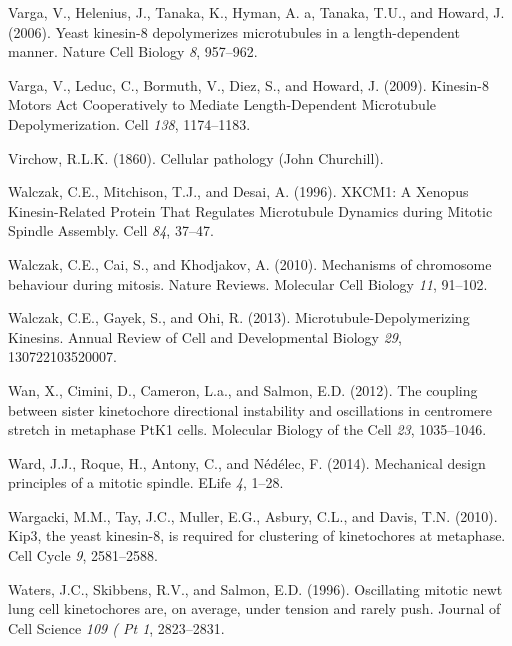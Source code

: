 \documentclass[12pt,a4paper,twoside,openright]{book}
\begin{document}
Varga, V., Helenius, J., Tanaka, K., Hyman, A. a, Tanaka, T.U., and
Howard, J. (2006). Yeast kinesin-8 depolymerizes microtubules in a
length-dependent manner. Nature Cell Biology \emph{8}, 957--962.

Varga, V., Leduc, C., Bormuth, V., Diez, S., and Howard, J. (2009).
Kinesin-8 Motors Act Cooperatively to Mediate Length-Dependent
Microtubule Depolymerization. Cell \emph{138}, 1174--1183.

Virchow, R.L.K. (1860). Cellular pathology (John Churchill).

Walczak, C.E., Mitchison, T.J., and Desai, A. (1996). XKCM1: A Xenopus
Kinesin-Related Protein That Regulates Microtubule Dynamics during
Mitotic Spindle Assembly. Cell \emph{84}, 37--47.

Walczak, C.E., Cai, S., and Khodjakov, A. (2010). Mechanisms of
chromosome behaviour during mitosis. Nature Reviews. Molecular Cell
Biology \emph{11}, 91--102.

Walczak, C.E., Gayek, S., and Ohi, R. (2013). Microtubule-Depolymerizing
Kinesins. Annual Review of Cell and Developmental Biology \emph{29},
130722103520007.

Wan, X., Cimini, D., Cameron, L.a., and Salmon, E.D. (2012). The
coupling between sister kinetochore directional instability and
oscillations in centromere stretch in metaphase PtK1 cells. Molecular
Biology of the Cell \emph{23}, 1035--1046.

Ward, J.J., Roque, H., Antony, C., and Nédélec, F. (2014). Mechanical
design principles of a mitotic spindle. ELife \emph{4}, 1--28.

Wargacki, M.M., Tay, J.C., Muller, E.G., Asbury, C.L., and Davis, T.N.
(2010). Kip3, the yeast kinesin-8, is required for clustering of
kinetochores at metaphase. Cell Cycle \emph{9}, 2581--2588.

Waters, J.C., Skibbens, R.V., and Salmon, E.D. (1996). Oscillating
mitotic newt lung cell kinetochores are, on average, under tension and
rarely push. Journal of Cell Science \emph{109 ( Pt 1}, 2823--2831.
\end{document}
